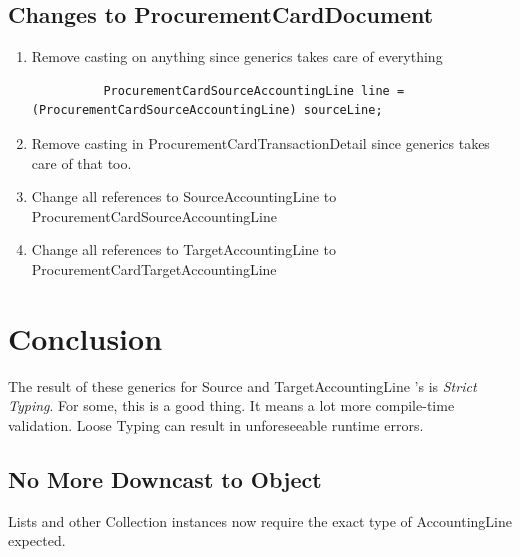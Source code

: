 \documentclass[12pt,notitlepage]{article}
\begin{document}
  \subsection{Changes to ProcurementCardDocument}
    \begin{enumerate}
      \item Remove casting on anything since generics takes care of everything
        \begin{lstlisting}
          ProcurementCardSourceAccountingLine line = (ProcurementCardSourceAccountingLine) sourceLine;
        \end{lstlisting}

      \item Remove casting in ProcurementCardTransactionDetail since generics takes care of that too.
      \item Change all references to SourceAccountingLine to ProcurementCardSourceAccountingLine
      
      
      \item Change all references to TargetAccountingLine to ProcurementCardTargetAccountingLine
      
      
    \end{enumerate}

    \section{Conclusion}
    The result of these generics for \sf Source \rm  and \sf TargetAccountingLine \rm 's is \emph{Strict Typing}. For some, this is a good thing. It means
    a lot more compile-time validation. Loose Typing can result in unforeseeable runtime errors.

    \subsection{No More Downcast to \sf Object \rm}
    \sf Lists \rm and other \sf Collection \rm instances now require the exact type of \sf AccountingLine \rm expected.
\end{document}
